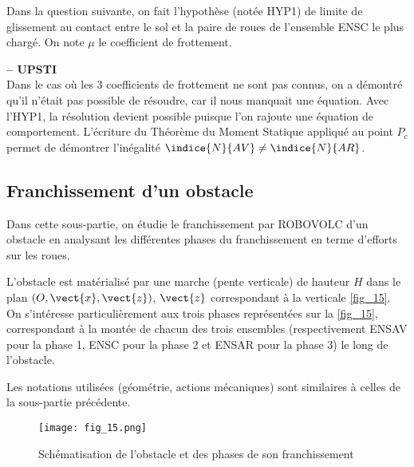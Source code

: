 Dans la question suivante, on fait l'hypothèse (notée HYP1) de limite de glissement au contact
entre le sol et la paire de roues de l'ensemble ENSC le plus chargé. On note $\mu$ le coefficient
de frottement.

\ifprof
\begin{corrige}\textbf{ -- UPSTI}\\ 
Dans le cas où les 3 coefficients de frottement ne sont pas connus, on a démontré qu’il n’était pas possible de résoudre, car il nous manquait une équation.
Avec l’HYP1, la résolution devient possible puisque l’on rajoute une équation de comportement.
L’écriture du Théorème du Moment Statique appliqué au point $P_c$  permet de démontrer l’inégalité $\indice{N}{AV}\neq \indice{N}{AR}$.

\end{corrige}
\else
\fi

\subsection{Franchissement d'un obstacle}

\begin{obj}
Dans cette sous-partie, on étudie le franchissement par ROBOVOLC d'un obstacle en
analysant les différentes phases du franchissement en terme d'efforts sur les roues.
\end{obj}
\ifprof\else
L'obstacle est matérialisé par une marche (pente verticale) de hauteur $H$ dans le plan $\left(O,\vect{x},\vect{z}\right)$,
$\vect{z}$ correspondant à la verticale \autoref{fig_15}.
On s'intéresse particulièrement aux trois phases représentées sur la \autoref{fig_15}, correspondant à la
montée de chacun des trois ensembles (respectivement ENSAV pour la phase 1, ENSC pour la
phase 2 et ENSAR pour la phase 3) le long de l'obstacle.

Les notations utilisées (géométrie, actions mécaniques) sont similaires à celles de la sous-partie
précédente.

\begin{figure}[H]
\centering
\texttt{[image: fig\_15.png]}
\caption{Schématisation de l'obstacle et des phases de son franchissement\label{fig_15}}
\end{figure}
\fi


